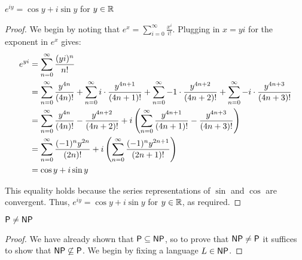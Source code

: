 \documentclass[name=Jacob\ Strieb, andrewid=jstrieb, course=69-420, num=4]{homework}
\begin{document}
\begin{claim}
    $e^{iy} = \cos y + i \sin y$ for $y \in \mathbb{R}$
\end{claim}
\begin{proof}
    We begin by noting that $e^x = \sum_{i = 0}^\infty \frac{x^i}{i!}$. Plugging in $x = yi$ for the exponent in $e^x$ gives:
    \begin{align*}
    e^{yi} &= \sum_{n = 0}^\infty \frac{(yi)^n}{n!} \\
    &= \sum_{n = 0}^\infty \frac{y^{4n}}{(4n)!} + \sum_{n = 0}^\infty i \cdot \frac{y^{4n + 1}}{(4n + 1)!} + \sum_{n = 0}^\infty -1 \cdot \frac{y^{4n + 2}}{(4n + 2)!} + \sum_{n = 0}^\infty -i \cdot \frac{y^{4n + 3}}{(4n + 3)!} \\
    &= \sum_{n = 0}^\infty \frac{y^{4n}}{(4n)!} - \frac{y^{4n + 2}}{(4n + 2)!} + i \left(  \sum_{n = 0}^\infty \frac{y^{4n + 1}}{(4n + 1)!} - \frac{y^{4n + 3}}{(4n + 3)!}  \right) \\
    &= \sum_{n = 0}^\infty \frac{(-1)^n y^{2n}}{(2n)!} + i \left( \sum_{n = 0}^\infty \frac{(-1)^n y^{2n + 1}}{(2n + 1)!} \right) \\
    &= \cos y + i \sin y
    \end{align*} 
    
    This equality holds because the series representations of $\sin$ and $\cos$ are convergent. Thus, $e^{iy} = \cos y + i \sin y$ for $y \in \mathbb{R}$, as required.
\end{proof}
\newpage

\begin{claim}
    $\mathsf{P} \neq \mathsf{NP}$
\end{claim}

\begin{proof}
    We have already shown that $\mathsf{P} \subseteq \mathsf{NP}$, so to prove that $\mathsf{NP} \neq \mathsf{P}$ it suffices to show that $\mathsf{NP} \not \subseteq \mathsf{P}$. We begin by fixing a language $L \in \mathsf{NP}$. 
    
    \todo %
\end{proof}
\newpage

\end{document}
